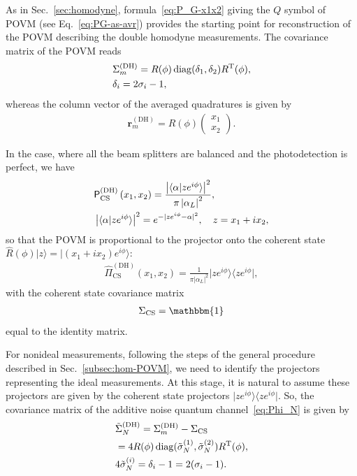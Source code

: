 \documentclass[%
reprint,
superscriptaddress,
 amsmath,amssymb,amsfonts,
 aps,
 pra,
 longbibliography
]{revtex4-2}
\newcommand{\ket}[1]{\ensuremath{|{#1}\rangle}}
\newcommand{\bra}[1]{\ensuremath{\langle{#1}|}}
\newcommand{\avr}[1]{\ensuremath{\langle{#1}\rangle}}
\newcommand{\tcnj}[1]{{#1}^{\mathrm{T}}}
\newcommand{\diag}{\mathop{\rm diag}\nolimits}
\newcommand{\vc}[1]{\mathbf{#1}}
\newcommand{\ind}[1]{\mathrm{#1}}
\newcommand{\prob}{\mathsf{P}}
\begin{document}
As in Sec.~\ref{sec:homodyne},
formula~\eqref{eq:P_G-x1x2}
giving the $Q$ symbol of POVM (see Eq.~\eqref{eq:PG-as-avr})
provides the starting point for reconstruction of the POVM
describing the double homodyne measurements.
The covariance matrix of the POVM reads
\begin{align}
\label{eq:Sigma_m-DH}
  &
  \Sigma_m^{(\ind{DH})}=R(\phi)\diag(\delta_1,\delta_2)\tcnj{R}(\phi),
  \\
  \label{eq:sigma-i}
  &
    \delta_i=2\sigma_i-1,
\end{align}
whereas the column vector of the averaged quadratures
is given by
\begin{align}
  \label{eq:r_m-DH}
  \vc{r}_m^{(\ind{DH})}=R(\phi)
  \begin{pmatrix}
    x_1\\x_2
  \end{pmatrix}.
\end{align}


In the case, where all the beam splitters are balanced
and the photodetection is perfect,
we have
\begin{align}
  &
  \label{eq:P0-hetero}
    \prob_{\ind{CS}}^{(\ind{DH})}\left(x_1,x_2\right)=\frac{\left|\avr{\alpha|ze^{i\phi}}\right|^2}{\pi
    \left|\alpha_L\right|^2},
    \notag
  \\
  &
    \left|\avr{\alpha|z e^{i\phi}}\right|^2=e^{-|z e^{i\phi}-\alpha|^2},
    \quad
    z= x_1+ix_2,
\end{align}
so that the POVM is proportional to the projector onto the coherent state
$\hat{R}(\phi)\ket{z}=\ket{\left(x_1+ix_2\right)e^{i\phi}}$:
\begin{align}
  \label{eq:POVM-hetero-ideal}
    \hat{\Pi}_{\ind{CS}}^{(\ind{DH})}(x_1,x_2)=\frac{1}{\pi \left|\alpha_L\right|^2} \ket{z e^{i\phi}}\bra{z e^{i\phi}},
\end{align}
with the coherent state covariance matrix
\begin{align}
  \label{eq:tilde-Sigma-DH-0}
  \Sigma_{\ind{CS}}=\mathbbm{1}
\end{align}
equal to the identity matrix.

For nonideal measurements,
following the steps of the general procedure described in Sec.~\ref{subsec:hom-POVM},
we need to identify the projectors representing the ideal measurements.
At this stage, it is natural to assume these projectors
are given by the coherent state projectors
$\ket{z e^{i\phi}}\bra{z e^{i\phi}}$.
So,
the covariance matrix of
the additive noise quantum channel~\eqref{eq:Phi_N}
is given by
\begin{align}
  &
  \label{eq:Sigma-N-CS}
    \tilde{\Sigma}_N^{(\ind{DH})}=\Sigma_m^{(\ind{DH})}-\Sigma_{\ind{CS}}
    \notag
  \\
  &
  =4 R(\phi)\diag(\tilde{\sigma}_N^{(1)},\tilde{\sigma}_N^{(2)})\tcnj{R}(\phi),
  \\
  &
    \label{eq:tsigm-N-i}
    4\tilde{\sigma}_{N}^{(i)}=\delta_i-1=2(\sigma_i-1).
\end{align}
\end{document}

